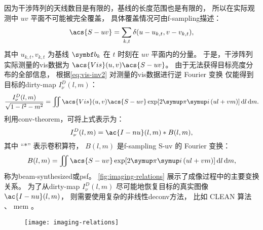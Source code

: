 因为干涉阵列的天线数目是有限的，基线的长度范围也是有限的，
所以在实际观测中 $uv$ 平面不可能被完全覆盖，
具体覆盖情况可由\acf{f-sampling}描述：
\begin{equation}
  \label{eq:sf}
  \acs{S-uv} = \sum_{k,t} \delta(u - u_{k,t}, v - v_{k,t}) ,
\end{equation}
其中 $u_{k,t}, v_{k,t}$ 为基线 $\B{b}_k$ 在 $t$ 时刻在 $uv$ 平面内的分量。
于是，干涉阵列实际测量的\ac{vis}数据为 $\acs{Vis}(u,v) \acs{S-uv}$。
由于无法获得目标亮度分布的全部信息，
根据\autoref{eq:vis-inv2} 对测量的\ac{vis}数据进行逆 Fourier 变换
仅能得到目标的\acf{dirty-map} $I_{\nu}^D(l,m)$：
\begin{equation}
  \label{eq:dirty-map}
  \frac{I_{\nu}^D(l,m)}{\sqrt{1-l^2-m^2}} = \iint
    \acs{Vis}(u,v) \acs{S-uv} \exp [2\Cpi\Ci\, (ul+vm)] \,\D{l}\,\D{m} .
\end{equation}
利用\ac{conv-theorem}，可将上式表示为：
\begin{equation}
  I_{\nu}^D(l,m) = \ac{I-nu}(l,m) * B(l,m) ,
\end{equation}
其中 \enquote{$*$} 表示卷积算符，
$B(l, m)$ 是\ac{f-sampling} \acs{S-uv} 的 Fourier 变换：
\begin{equation}
  \label{eq:syn-beam}
  B(l,m) = \iint \acs{S-uv} \exp [2\Cpi\Ci\, (ul+vm)] \,\D{l}\,\D{m} ,
\end{equation}
称为\acf{beam-synthesized}或\acf{psf}。
\autoref{fig:imaging-relations} 展示了成像过程中的主要变换关系。
为了从\ac{dirty-map} $I_{\nu}^D(l,m)$ 尽可能地恢复目标的真实图像 $\ac{I-nu}(l,m)$，
则需要使用复杂的非线性\ac{deconv}方法，
比如 CLEAN 算法 \cite{hogbom1974,cornwell1999}、
\ac{mem} \cite{narayan1986}。

\begin{figure}[htp]
  \centering
  \texttt{[image: imaging-relations]}
  \label{fig:imaging-relations}
\end{figure}

